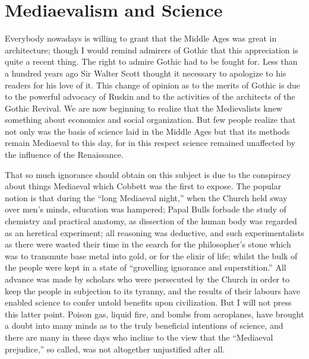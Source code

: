 \documentclass{book}
\begin{document}
\chapter{Mediaevalism and Science}
\label{chapter-7}
Everybody nowadays is willing to grant that the Middle Ages was great in architecture; though I would remind admirers of Gothic that this appreciation is quite a recent thing. The right to admire Gothic had to be fought for. Less than a hundred years ago Sir Walter Scott thought it necessary to apologize to his readers for his love of it. This change of opinion as to the merits of Gothic is due to the powerful advocacy of Ruskin and to the activities of the architects of the Gothic Revival. We are now beginning to realize that the Medievalists knew something about economics and social organization. But few people realize that not only was the basis of science laid in the Middle Ages but that its methods remain Mediaeval to this day, for in this respect science remained unaffected by the influence of the Renaissance.

That so much ignorance should obtain on this subject is due to the conspiracy about things Mediaeval which Cobbett was the first to expose. The popular notion is that during the “long Mediaeval night,” when the Church held sway over men’s minds, education was hampered; Papal Bulls forbade the study of chemistry and practical anatomy, as dissection of the human body was regarded as an heretical experiment; all reasoning was deductive, and such experimentalists as there were wasted their time in the search for the philosopher’s stone which was to transmute base metal into gold, or for the elixir of life; whilst the bulk of the people were kept in a state of “grovelling ignorance and superstition.” All advance was made by scholars who were persecuted by the Church in order to keep the people in subjection to its tyranny, and the results of their labours have enabled science to confer untold benefits upon civilization. But I will not press this latter point. Poison gas, liquid fire, and bombs from aeroplanes, have brought a doubt into many minds as to the truly beneficial intentions of science, and there are many in these days who incline to the view that the “Mediaeval prejudice,” so called, was not altogether unjustified after all.
\end{document}
